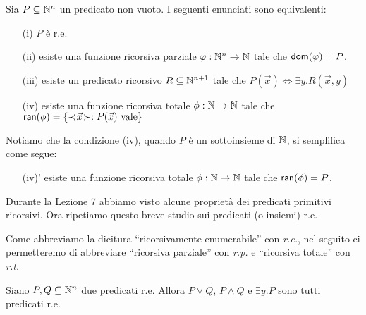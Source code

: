 \documentclass[runningheads,a4paper]{llncs}
\begin{document}
\begin{theorem}\label{thm:characterize-r.e.}
Sia $P \subseteq \mathbb{N}^n$ un predicato non vuoto. I seguenti enunciati sono equivalenti:
\begin{itemize}
\item[(i)] $P$ \`{e} r.e.
\item[(ii)] esiste una funzione ricorsiva parziale $\varphi: \mathbb{N}^n \to \mathbb{N}$ tale che $\mathsf{dom}(\varphi) = P$.
\item[(iii)] esiste un predicato ricorsivo $R \subseteq \mathbb{N}^{n+1}$ tale che $P(\vec x) \Leftrightarrow \exists y.R(\vec x,y)$
\item[(iv)] esiste una funzione ricorsiva totale $\phi: \mathbb{N} \to \mathbb{N}$ tale che\\ $\mathsf{ran}(\phi) = \{\prec\! \vec x \!\succ : P(\vec x) \mbox{ vale} \}$
\end{itemize}
\end{theorem}

Notiamo che la condizione (iv), quando $P$ \`{e} un sottoinsieme di $\mathbb{N}$, si semplifica come segue:
\begin{itemize}
\item[(iv)'] esiste una funzione ricorsiva totale $\phi: \mathbb{N} \to \mathbb{N}$ tale che $\mathsf{ran}(\phi) = P$.
\end{itemize}

Durante la Lezione 7 abbiamo visto alcune propriet\`{a} dei predicati primitivi ricorsivi. Ora ripetiamo questo breve studio
 sui predicati (o insiemi) r.e.

Come abbreviamo la dicitura ``ricorsivamente enumerabile'' con \emph{r.e.}, nel seguito ci permetteremo di abbreviare ``ricorsiva parziale''
 con \emph{r.p.} e ``ricorsiva totale'' con \emph{r.t.} 

\begin{lemma}\label{lem:log-clos}
Siano $P,Q \subseteq \mathbb{N}^n$ due predicati r.e. Allora $P \vee Q$, $P \wedge Q$ e $\exists y.P$ sono tutti predicati r.e.
\end{lemma}
\end{document}
